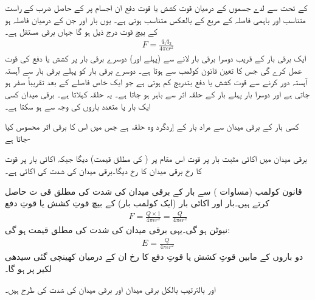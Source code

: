 %
 کے تحت  سے لدے جسموں کے درمیان قوت کشش یا قوت دفع ان اجسام پر   کے حاصل ضرب کے راست متناسب اور باہمی فاصلہ کے مربع کے بالعکس متناسب ہوتی ہے۔ یوں بار  اور  جن کے درمیان فاصلہ  ہو کے بیچ قوت  درج ذیل ہو گا جہاں  برقی مستقل ہے۔ 
\begin{align}\label{مساوات_بنیادی_کولمب_کا_قانون}
F=\frac{q_1 q_2}{4 \pi \epsilon r^2}
\end{align}
ایک برقی بار کے قریب  دوسرا برقی بار لانے سے  (پہلے اور) دوسرے برقی بار پر کشش یا دفع کی قوت عمل کرے گی جس کا تعین قانون کولمب سے ہوتا ہے۔ دوسرے برقی بار کو پہلے برقی بار سے آہستہ آہستہ دور کرنے سے  قوت کشش یا دفع بتدریج کم ہوتی ہے جو ایک خاص فاصلے کے بعد تقریباً صفر ہو جاتی ہے اور دوسرا بار پہلے بار کے حلقہ اثر سے باہر ہو جاتا ہے۔ یہ حلقہ    کہلاتا ہے۔ برقی میدان کسی ایک بار یا متعدد  باروں کی وجہ سے ہو سکتا ہے۔ 

 کسی بار کے برقی میدان سے مراد بار کے اِردگرد وہ حلقہ ہے جس میں اس کا برقی اثر محسوس کیا جاتا ہے-

برقی میدان میں اکائی مثبت بار پر قوت اس مقام پر   ( کی مطلق قیمت) دیگا جبکہ اکائی بار پر قوت کا رخ برقی میدان کا رخ دیگا۔برقی میدان کی شدت کی اکائی  ہے۔

قانون کولمب (مساوات )   سے    بار کے برقی میدان کی شدت کی مطلق قی ت حاصل کرتے  ہیں۔بار   اور اکائی بار (ایک کولمب بار) کے بیچ  قوتِ کشش یا قوتِ دفع 
\begin{align}
F=\frac{Q \times 1}{4 \pi \epsilon r^2}=\frac{Q}{4\pi\epsilon r^2}
\end{align}
نیوٹن ہو گی۔یہی برقی میدان کی شدت کی مطلق قیمت ہو گی:
\begin{align}
E=\frac{Q}{4\pi\epsilon r^2}
\end{align}
دو باروں  کے مابین قوتِ کشش یا قوتِ دفع کا رخ ان کے درمیان کھینچی گئی سیدھی لکیر پر ہو گا۔

 اور  بالترتیب بالکل برقی میدان اور برقی میدان کی شدت کی طرح ہیں۔


